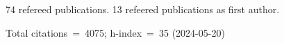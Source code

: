 74 refereed publications. 13 refeered publications as first author.

Total citations~=~4075; h-index~=~35 (2024-05-20)
